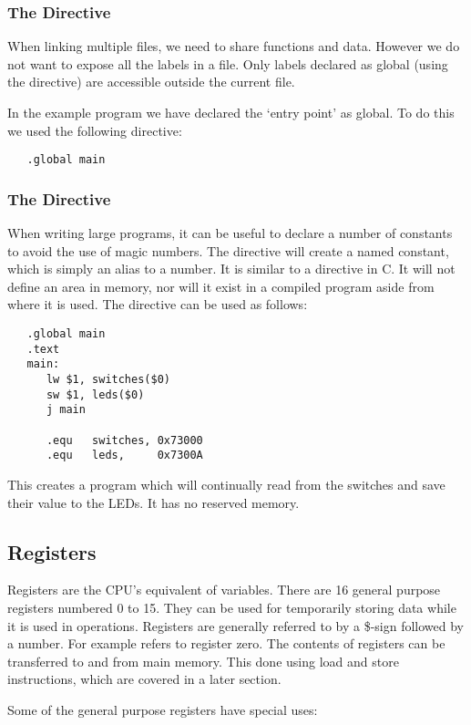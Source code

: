 \subsubsection{The \Global Directive}
When linking multiple files, we need to share functions and data.
However we do not want to expose all the labels in a file.
Only labels declared as global (using the \Global directive) are
accessible outside the current file.

In the example program we have declared the `entry point'  as 
global. To do this we used the following directive:
\begin{verbatim}
   .global main
\end{verbatim}

\subsubsection{The \equ Directive}
When writing large programs, it can be useful to declare a number of
constants to avoid the use of magic numbers. The \equ directive will
create a named constant, which is simply an alias to a number. It is
similar to a  directive in C. It will not define an
area in memory, nor will it exist in a compiled program aside from
where it is used. The directive can be used as follows:

\begin{verbatim}
   .global main
   .text
   main:
      lw $1, switches($0)
      sw $1, leds($0)
      j main

      .equ   switches, 0x73000
      .equ   leds,     0x7300A
\end{verbatim}

This creates a program which will continually read from the switches
and save their value to the LEDs. It has no reserved memory.

\subsection{Registers}
Registers are the CPU's equivalent of variables. There are 16 general
purpose registers numbered 0 to 15. They can be used for temporarily
storing data while it is used in operations. Registers are generally
referred to by a \$-sign followed by a number. For example 
refers to register zero. The contents of registers can be transferred
to and from main memory. This done using load and store instructions,
which are covered in a later section.

Some of the general purpose registers have special uses:

